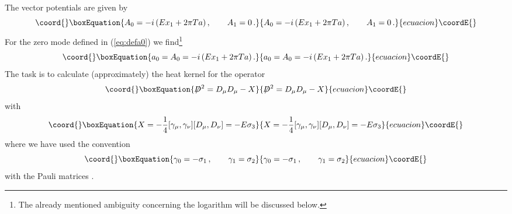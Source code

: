 \documentclass[a4paper,showpacs,showkeys,prd,nofootinbib]{revtex4}
\begin{document}
The vector potentials are given by
\begin{equation}\coord{}\boxEquation{
  \label{eq:actorvpot}
A_0 = -i \, (E x_1 + 2 \pi T a) \,, \qquad A_1 = 0  \,.
}{
  A_0 = -i \, (E x_1 + 2 \pi T a) \,, \qquad A_1 = 0  \,.
}{ecuacion}\coordE{}\end{equation}
For the zero mode defined in (\ref{eq:defa0}) we find\footnote{The already mentioned
ambiguity concerning the logarithm will be discussed below.}
\begin{equation}\coord{}\boxEquation{
  \label{eq:twodimzeromode}
a_0 = A_0 = -i \, (E x_1 + 2 \pi T a) \,.
}{
  a_0 = A_0 = -i \, (E x_1 + 2 \pi T a) \,.
}{ecuacion}\coordE{}\end{equation}
The task is to calculate (approximately) the heat kernel for the operator
\begin{equation}\coord{}\boxEquation{
  \label{eq:twodimop}
\not \! \! D^2 = D_\mu D_\mu - X
}{
  \not \! \! D^2 = D_\mu D_\mu - X
}{ecuacion}\coordE{}\end{equation}
with
\begin{equation}\coord{}\boxEquation{
  \label{eq:twodimX}
X = -{1 \over 4} [\gamma_\mu,\gamma_\nu] [D_\mu,D_\nu] = -E \sigma_3
}{
  X = -{1 \over 4} [\gamma_\mu,\gamma_\nu] [D_\mu,D_\nu] = -E \sigma_3
}{ecuacion}\coordE{}\end{equation}
where we have used the convention \cite{Actor:1998cn}
\begin{equation}\coord{}\boxEquation{
  \label{eq:convgamma}
\gamma_0 = -\sigma_1 \,, \qquad \gamma_1 = \sigma_2
}{
  \gamma_0 = -\sigma_1 \,, \qquad \gamma_1 = \sigma_2
}{ecuacion}\coordE{}\end{equation}
with the Pauli matrices \coordHE{}.
\end{document}
